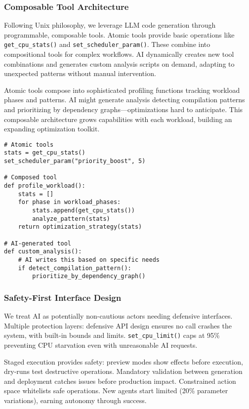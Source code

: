 \subsubsection{Composable Tool Architecture}
Following Unix philosophy, we leverage LLM code generation through programmable, composable tools. Atomic tools provide basic operations like \texttt{get\_cpu\_stats()} and \texttt{set\_scheduler\_param()}. These combine into compositional tools for complex workflows. AI dynamically creates new tool combinations and generates custom analysis scripts on demand, adapting to unexpected patterns without manual intervention.

Atomic tools compose into sophisticated profiling functions tracking workload phases and patterns. AI might generate analysis detecting compilation patterns and prioritizing by dependency graphs—optimizations hard to anticipate. This composable architecture grows capabilities with each workload, building an expanding optimization toolkit.

\begin{verbatim}
# Atomic tools
stats = get_cpu_stats()
set_scheduler_param("priority_boost", 5)

# Composed tool
def profile_workload():
    stats = []
    for phase in workload_phases:
        stats.append(get_cpu_stats())
        analyze_pattern(stats)
    return optimization_strategy(stats)

# AI-generated tool
def custom_analysis():
    # AI writes this based on specific needs
    if detect_compilation_pattern():
        prioritize_by_dependency_graph()
\end{verbatim}

\subsubsection{Safety-First Interface Design}
We treat AI as potentially non-cautious actors needing defensive interfaces. Multiple protection layers: defensive API design ensures no call crashes the system, with built-in bounds and limits. \texttt{set\_cpu\_limit()} caps at 95\% preventing CPU starvation even with unreasonable AI requests.

Staged execution provides safety: preview modes show effects before execution, dry-runs test destructive operations. Mandatory validation between generation and deployment catches issues before production impact. Constrained action space whitelists safe operations. New agents start limited (20\% parameter variations), earning autonomy through success.

